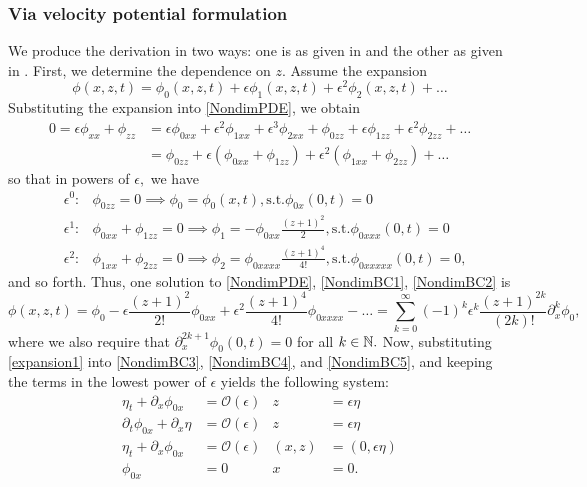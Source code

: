 \documentclass[10pt,reqno,oneside,a4paper]{article}
\begin{document}
\subsubsection{Via velocity potential formulation}
We produce the derivation in two ways: one is as given in \cite{bernard} and the other as given in \cite{ablowitz}. First, we determine the dependence on $z.$ Assume the expansion 
\[
\phi(x,z,t) = \phi_0(x,z,t) + \epsilon \phi_1(x,z,t) + \epsilon^2 \phi_2(x,z,t) + \ldots
\]
Substituting the expansion into \eqref{NondimPDE}, we obtain
\begin{align*}
0 = \epsilon\phi_{xx} + \phi_{zz} &= \epsilon\phi_{0xx} + \epsilon^2 \phi_{1xx}+ \epsilon^3 \phi_{2xx} + \phi_{0zz} + \epsilon \phi_{1zz}+ \epsilon^2 \phi_{2zz} + \ldots \\
&= \phi_{0zz} + \epsilon(\phi_{0xx} + \phi_{1zz}) + \epsilon^2(\phi_{1xx}+\phi_{2zz}) + \ldots
\end{align*}
so that in powers of $\epsilon,$ we have
\begin{align*}
&\epsilon^0: &\phi_{0zz} = 0 \implies \phi_0 = \phi_0(x,t), \mbox{s.t.} \phi_{0x}(0,t) = 0 \\
&\epsilon^1: &\phi_{0xx} + \phi_{1zz} = 0 \implies \phi_1 = - \phi_{0xx} \frac{(z+1)^2}{2},  \mbox{s.t.} \phi_{0xxx}(0,t) = 0 \\
&\epsilon^2: &\phi_{1xx}+\phi_{2zz} = 0 \implies \phi_2 = \phi_{0xxxx} \frac{(z+1)^4}{4!},  \mbox{s.t.} \phi_{0xxxxx}(0,t) = 0,
\end{align*}
and so forth. Thus, one solution to \eqref{NondimPDE}, \eqref{NondimBC1}, \eqref{NondimBC2} is 
\begin{equation}\label{expansion1}
\phi(x,z,t) = \phi_0 - \epsilon\frac{(z+1)^2}{2!}\phi_{0xx} + \epsilon^2 \frac{(z+1)^4}{4!}\phi_{0xxxx} - \ldots = \sum^{\infty}_{k=0} (-1)^k \epsilon^k \frac{(z+1)^{2k}}{(2k)!} \partial^k_x \phi_0,
\end{equation}
where we also require that $\partial_x^{2k+1}\phi_0(0,t) = 0$ for all $k \in \mathbb N.$ Now, substituting \eqref{expansion1} into \eqref{NondimBC3}, \eqref{NondimBC4}, and \eqref{NondimBC5}, and keeping the terms in the lowest power of $\epsilon$ yields the following system:
\begin{subequations} \label{NonDimHalfLineProb1}
\begin{align}
\label{P1BC1}\eta_t + \partial_x\phi_{0x} &= \mathcal{O}(\epsilon) &z &= \epsilon\eta \\
\label{P1BC2}\partial_t\phi_{0x} + \partial_x \eta &=  \mathcal{O}(\epsilon) &z &= \epsilon\eta  \\
\label{P1BC3}\eta_t + \partial_x\phi_{0x} &= \mathcal{O}(\epsilon) &(x,z) &= (0,\epsilon\eta) \\
\label{P1BC4}\phi_{0x} &= 0 &x &= 0.
\end{align}
\end{subequations}
\end{document}
